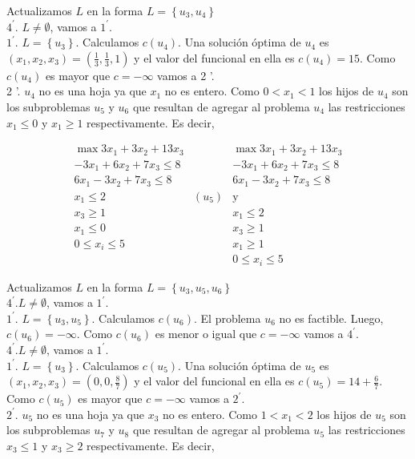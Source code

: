 \documentclass[10pt]{article}
\begin{document}
Actualizamos $L$ en la forma $L=\left\{u_{3}, u_{4}\right\}$\\
$4^{\prime}$. $L \neq \emptyset$, vamos a $1^{\prime}$.\\
$1^{\prime}$. $L=\left\{u_{3}\right\}$. Calculamos $c\left(u_{4}\right)$. Una solución óptima de $u_{4}$ es $\left(x_{1}, x_{2}, x_{3}\right)=\left(\frac{1}{3}, \frac{1}{3}, 1\right)$ y el valor del funcional en ella es $c\left(u_{4}\right)=15$. Como $c\left(u_{4}\right)$ es mayor que $c=-\infty$ vamos a 2 '.\\
2 '. $u_{4}$ no es una hoja ya que $x_{1}$ no es entero. Como $0<x_{1}<1$ los hijos de $u_{4}$ son los subproblemas $u_{5}$ y $u_{6}$ que resultan de agregar al problema $u_{4}$ las restricciones $x_{1} \leq 0$ y $x_{1} \geq 1$ respectivamente. Es decir,

$$
\begin{array}{ccc}
\max 3 x_{1}+3 x_{2}+13 x_{3} & & \max 3 x_{1}+3 x_{2}+13 x_{3} \\
-3 x_{1}+6 x_{2}+7 x_{3} \leq 8 & & -3 x_{1}+6 x_{2}+7 x_{3} \leq 8 \\
6 x_{1}-3 x_{2}+7 x_{3} \leq 8 & & 6 x_{1}-3 x_{2}+7 x_{3} \leq 8 \\
x_{1} \leq 2 & \left(u_{5}\right) & \mathrm{y} \\
x_{3} \geq 1 & & x_{1} \leq 2 \\
x_{1} \leq 0 & & x_{3} \geq 1 \\
0 \leq x_{i} \leq 5 & & x_{1} \geq 1 \\
& & 0 \leq x_{i} \leq 5
\end{array}
$$

Actualizamos $L$ en la forma $L=\left\{u_{3}, u_{5}, u_{6}\right\}$\\
$4^{\prime} . L \neq \emptyset$, vamos a $1^{\prime}$.\\
$1^{\prime}$. $L=\left\{u_{3}, u_{5}\right\}$. Calculamos $c\left(u_{6}\right)$. El problema $u_{6}$ no es factible. Luego, $c\left(u_{6}\right)=-\infty$. Como $c\left(u_{6}\right)$ es menor o igual que $c=-\infty$ vamos a $4^{\prime}$.\\
$4^{\prime} . L \neq \emptyset$, vamos a $1^{\prime}$.\\
$1^{\prime}$. $L=\left\{u_{3}\right\}$. Calculamos $c\left(u_{5}\right)$. Una solución óptima de $u_{5}$ es $\left(x_{1}, x_{2}, x_{3}\right)=\left(0,0, \frac{8}{7}\right)$ y el valor del funcional en ella es $c\left(u_{5}\right)=14+\frac{6}{7}$. Como $c\left(u_{5}\right)$ es mayor que $c=-\infty$ vamos a $2^{\prime}$.\\
$2^{\prime}$. $u_{5}$ no es una hoja ya que $x_{3}$ no es entero. Como $1<x_{1}<2$ los hijos de $u_{5}$ son los subproblemas $u_{7}$ y $u_{8}$ que resultan de agregar al problema $u_{5}$ las restricciones $x_{3} \leq 1$ y $x_{3} \geq 2$ respectivamente. Es decir,
\end{document}
